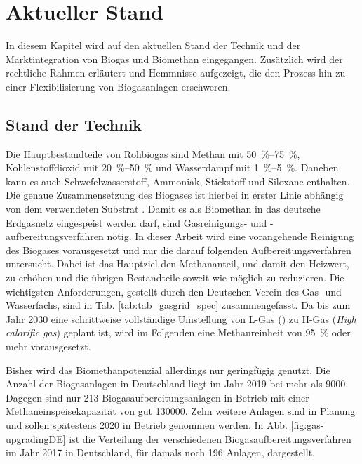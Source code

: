 \section{Aktueller Stand}
In diesem Kapitel wird auf den aktuellen Stand der Technik und der Marktintegration von Biogas und Biomethan eingegangen. Zusätzlich wird der rechtliche Rahmen erläutert und Hemmnisse aufgezeigt, die den Prozess hin zu einer Flexibilisierung von Biogasanlagen erschweren.


\subsection{Stand der Technik}\label{chap:stateofart}

Die Hauptbestandteile von Rohbiogas sind Methan mit \SIrange{50}{75}{\percent}, Kohlenstoffdioxid mit \SIrange{20}{50}{\percent} und Wasserdampf mit \SIrange{1}{5}{\percent}. Daneben kann es auch Schwefelwasserstoff, Ammoniak, Stickstoff und Siloxane enthalten. Die genaue Zusammensetzung des Biogases ist hierbei in erster Linie abhängig von dem verwendeten Substrat \parencite{Rasi09}. Damit es als Biomethan in das deutsche Erdgasnetz eingespeist werden darf, sind Gasreinigungs- und -aufbereitungsverfahren nötig. In dieser Arbeit wird eine vorangehende Reinigung des Biogases vorausgesetzt und nur die darauf folgenden Aufbereitungsverfahren untersucht. Dabei ist das Hauptziel den Methananteil, und damit den Heizwert, zu erhöhen und die übrigen Bestandteile soweit wie möglich zu reduzieren. Die wichtigsten Anforderungen, gestellt durch den Deutschen Verein des Gas- und Wasserfachs, sind in Tab. \ref{tab:tab_gasgrid_spec} zusammengefasst. Da bis zum Jahr \SI{2030}{\relax} eine schrittweise vollständige Umstellung von L-Gas () zu H-Gas (\textit{High calorific gas}) geplant ist, wird im Folgenden eine Methanreinheit von \SI{95}{\percent} oder mehr vorausgesetzt. \parencite{FNR14} \parencite{Gas20} \parencite{KoBi16}



Bisher wird das Biomethanpotenzial allerdings nur geringfügig genutzt. Die Anzahl der Biogasanlagen in Deutschland liegt im Jahr \SI{2019}{\relax} bei mehr als \SI{9000}{\relax}. Dagegen sind nur \SI{213}{\relax} Biogasaufbereitungsanlagen in Betrieb mit einer Methaneinspeisekapazität von gut \SI{130000}{\normvolh}. Zehn weitere Anlagen sind in Planung und sollen spätestens \SI{2020}{\relax} in Betrieb genommen werden. In Abb. \ref{fig:gas-upgradingDE} ist die Verteilung der verschiedenen Biogasaufbereitungsverfahren im Jahr \SI{2017}{\relax} in Deutschland, für damals noch \SI{196}{\relax} Anlagen, dargestellt. \parencite{FaBio19} \parencite{dena19}

